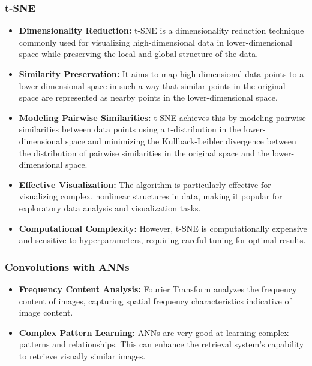 \documentclass[a4paper]{article}
\theoremstyle{plain}
\theoremstyle{definition}
\begin{document}
{\subsubsection{t-SNE}
\begin{itemize}
\item[] \textbf{Dimensionality Reduction:} t-SNE is a dimensionality reduction technique commonly used for visualizing high-dimensional data in lower-dimensional space while preserving the local and global structure of the data.
    
    \item[] \textbf{Similarity Preservation:} It aims to map high-dimensional data points to a lower-dimensional space in such a way that similar points in the original space are represented as nearby points in the lower-dimensional space.
    
    \item[] \textbf{Modeling Pairwise Similarities:} t-SNE achieves this by modeling pairwise similarities between data points using a t-distribution in the lower-dimensional space and minimizing the Kullback-Leibler divergence between the distribution of pairwise similarities in the original space and the lower-dimensional space.
    
    \item[] \textbf{Effective Visualization:} The algorithm is particularly effective for visualizing complex, nonlinear structures in data, making it popular for exploratory data analysis and visualization tasks.
    
    \item[] \textbf{Computational Complexity:} However, t-SNE is computationally expensive and sensitive to hyperparameters, requiring careful tuning for optimal results.

\end{itemize}




\subsubsection{Convolutions with ANNs}
\begin{itemize}
    \item[] \textbf{Frequency Content Analysis:} Fourier Transform analyzes the frequency content of images, capturing spatial frequency characteristics indicative of image content.

    
    \item[] \textbf{Complex Pattern Learning:} ANNs are very good at learning complex patterns and relationships. This can enhance the retrieval system's capability to retrieve visually similar images.
    

\end{itemize}}
\end{document}
